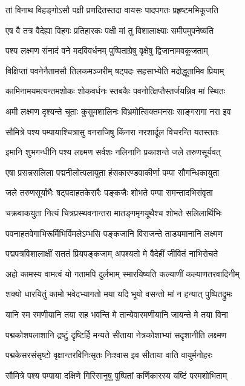\twolineshloka
{तां विनाथ विहङ्गोऽसौ पक्षी प्रणदितस्तदा}
{वायसः पादपगतः प्रहृष्टमभिकूजति} %

\twolineshloka
{एष वै तत्र वैदेह्या विहगः प्रतिहारकः}
{पक्षी मां तु विशालाक्ष्याः समीपमुपनेष्यति} %

\twolineshloka
{पश्य लक्ष्मण संनादं वने मदविवर्धनम्}
{पुष्पिताग्रेषु वृक्षेषु द्विजानामवकूजताम्} %

\twolineshloka
{विक्षिप्तां पवनेनैतामसौ तिलकमञ्जरीम्}
{षट्पदः सहसाभ्येति मदोद्धूतामिव प्रियाम्} %

\twolineshloka
{कामिनामयमत्यन्तमशोकः शोकवर्धनः}
{स्तबकैः पवनोत्क्षिप्तैस्तर्जयन्निव मां स्थितः} %

\twolineshloka
{अमी लक्ष्मण दृश्यन्ते चूताः कुसुमशालिनः}
{विभ्रमोत्सिक्तमनसः साङ्गरागा नरा इव} %

\twolineshloka
{सौमित्रे पश्य पम्पायाश्चित्रासु वनराजिषु}
{किंनरा नरशार्दूल विचरन्ति यतस्ततः} %

\twolineshloka
{इमानि शुभगन्धीनि पश्य लक्ष्मण सर्वशः}
{नलिनानि प्रकाशन्ते जले तरुणसूर्यवत्} %

\twolineshloka
{एषा प्रसन्नसलिला पद्मनीलोत्पलायुता}
{हंसकारण्डवाकीर्णा पम्पा सौगन्धिकायुता} %

\twolineshloka
{जले तरुणसूर्याभैः षट्पदाहतकेसरैः}
{पङ्कजैः शोभते पम्पा समन्तादभिसंवृता} %

\twolineshloka
{चक्रवाकयुता नित्यं चित्रप्रस्थवनान्तरा}
{मातङ्गमृगयूथैश्च शोभते सलिलार्थिभिः} %

\twolineshloka
{पवनाहतवेगाभिरूर्मिभिर्विमलेऽम्भसि}
{पङ्कजानि विराजन्ते ताड्यमानानि लक्ष्मण} %

\twolineshloka
{पद्मपत्रविशालाक्षीं सततं प्रियपङ्कजाम्}
{अपश्यतो मे वैदेहीं जीवितं नाभिरोचते} %

\twolineshloka
{अहो कामस्य वामत्वं यो गतामपि दुर्लभाम्}
{स्मारयिष्यति कल्याणीं कल्याणतरवादिनीम्} %

\twolineshloka
{शक्यो धारयितुं कामो भवेदभ्यागतो मया}
{यदि भूयो वसन्तो मां न हन्यात् पुष्पितद्रुमः} %

\twolineshloka
{यानि स्म रमणीयानि तया सह भवन्ति मे}
{तान्येवारमणीयानि जायन्ते मे तया विना} %

\twolineshloka
{पद्मकोशपलाशानि द्रष्टुं दृष्टिर्हि मन्यते}
{सीताया नेत्रकोशाभ्यां सदृशानीति लक्ष्मण} %

\twolineshloka
{पद्मकेसरसंसृष्टो वृक्षान्तरविनिःसृतः}
{निःश्वास इव सीताया वाति वायुर्मनोहरः} %

\twolineshloka
{सौमित्रे पश्य पम्पाया दक्षिणे गिरिसानुषु}
{पुष्पितां कर्णिकारस्य यष्टिं परमशोभिताम्} %

